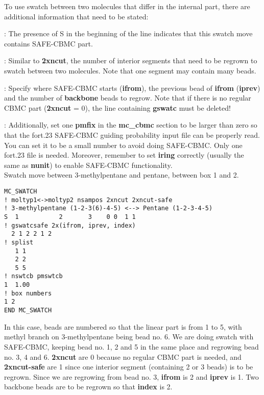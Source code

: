 \documentclass[12pt,letterpaper]{article}
\begin{document}
\noindent To use swatch between two molecules that differ in the internal part, there are additional information that need to be stated:

: The presence of S in the beginning of the line indicates that this swatch move contains SAFE-CBMC part.

: Similar to {\bf 2xncut}, the number of interior segments that need to be regrown to swatch between two molecules. Note that one segment may contain many beads.

: Specify where SAFE-CBMC starts ({\bf ifrom}), the previous bead of {\bf ifrom} ({\bf iprev}) and the number of {\bf backbone} beads to regrow. Note that if there is no regular CBMC part ({\bf 2xncut} = 0), the line containing {\bf gswatc} must be deleted!  

: Additionally, set one {\bf pmfix} in the {\bf mc\_cbmc} section to be larger than zero so that the fort.23 SAFE-CBMC guiding probability input file can be properly read. You can set it to be a small number to avoid doing SAFE-CBMC. Only one fort.23 file is needed. Moreover, remember to set {\bf iring} correctly (usually the same as {\bf nunit}) to enable SAFE-CBMC functionality. \\

\hfill\break
Swatch move between 3-methylpentane and pentane, between box 1 and 2.

\begin{verbatim}
MC_SWATCH
! moltyp1<->moltyp2 nsampos 2xncut 2xncut-safe  
! 3-methylpentane (1-2-3(6)-4-5) <--> Pentane (1-2-3-4-5)
S  1           2       3    0 0  1 1
! gswatcsafe 2x(ifrom, iprev, index)
  2 1 2 2 1 2
! splist
   1 1
   2 2
   5 5
! nswtcb pmswtcb
1  1.00
! box numbers
1 2
END MC_SWATCH
\end{verbatim}

\noindent In this case, beads are numbered so that the linear part is from 1 to 5, with methyl branch on 3-methylpentane being bead no. 6. We are doing swatch with SAFE-CBMC, keeping bead no. 1, 2 and 5 in the same place and regrowing bead no. 3, 4 and 6. {\bf 2xncut} are 0 because no regular CBMC part is needed, and {\bf 2xncut-safe} are 1 since one interior segment (containing 2 or 3 beads) is to be regrown. Since we are regrowing from bead no. 3, {\bf ifrom} is 2 and {\bf iprev} is 1. Two backbone beads are to be regrown so that {\bf index} is 2.
\end{document}
